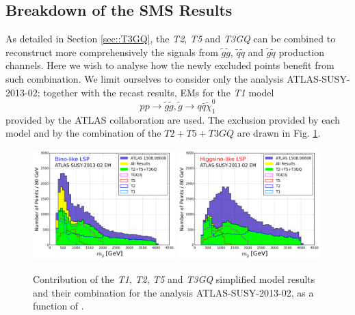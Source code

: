 \documentclass[epj,nopacs,fleqn]{svjour}
\begin{document}
\subsection{Breakdown of the SMS Results}
As detailed in Section \ref{sec::T3GQ}, the \textit{T2}, \textit{T5} and \textit{T3GQ} can be combined to reconstruct more comprehensively the signals from $\tilde g \tilde g$, $\tilde q \tilde q$ and $\tilde g \tilde q$ production channels. Here we wish to analyse how the newly excluded points benefit from such combination. We limit ourselves to consider only the analysis ATLAS-SUSY-2013-02; together with the recast results, EMs for the \textit{T1} model 
\begin{equation}
p p \rightarrow \tilde g \tilde g , \tilde g \rightarrow q \bar q \tilde \chi_1 ^0
\end{equation}
provided by the ATLAS collaboration are used. The exclusion provided by each model and by the combination of the $T2+T5+T3GQ$ are drawn in Fig. \ref{combination_gluino}. 
%
\begin{figure}[!]
\begin{center}
\subfigure
\includegraphics[width=0.49\textwidth]{PLOTS/Combination/BINO_Txnames_Contribution_ATLAS02_Gluino.png}
\subfigure
\includegraphics[width=0.49\textwidth]{PLOTS/Combination/HIGGSINO_Txnames_Contribution_ATLAS02_Gluino.png}
\end{center}
\caption{Contribution of the \textit{T1}, \textit{T2}, \textit{T5} and \textit{T3GQ} simplified model results and their combination for the analysis ATLAS-SUSY-2013-02, as a function of \MGLU.} 
\label{combination_gluino}
\end{figure}
\end{document}
